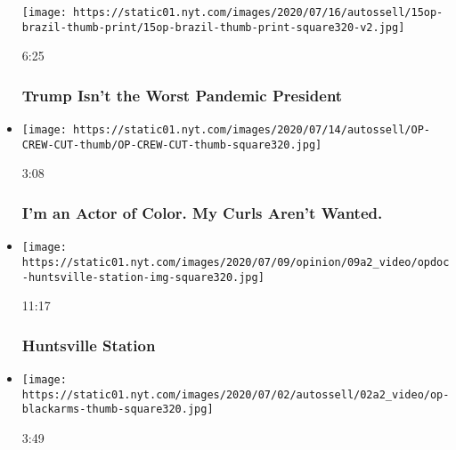 \begin{itemize}
  \texttt{[image: https://static01.nyt.com/images/2020/07/16/autossell/15op-brazil-thumb-print/15op-brazil-thumb-print-square320-v2.jpg]}

  6:25

  \hypertarget{trump-isnt-the-worst-pandemic-president}{%
  \subsubsection{Trump Isn't the Worst Pandemic
  President}\label{trump-isnt-the-worst-pandemic-president}}
\item
  \href{https://www.nytimes.com/video/opinion/100000007227752/hollywood-latinos-diversity.html?action=click\&module=video-series-bar\&region=header\&pgtype=Article\&playlistId=video/opinion}{}

  \texttt{[image: https://static01.nyt.com/images/2020/07/14/autossell/OP-CREW-CUT-thumb/OP-CREW-CUT-thumb-square320.jpg]}

  3:08

  \hypertarget{im-an-actor-of-color-my-curls-arent-wanted}{%
  \subsubsection{I'm an Actor of Color. My Curls Aren't
  Wanted.}\label{im-an-actor-of-color-my-curls-arent-wanted}}
\item
  \href{https://www.nytimes.com/video/opinion/100000007080462/huntsville-station.html?action=click\&module=video-series-bar\&region=header\&pgtype=Article\&playlistId=video/opinion}{}

  \texttt{[image: https://static01.nyt.com/images/2020/07/09/opinion/09a2\_video/opdoc-huntsville-station-img-square320.jpg]}

  11:17

  \hypertarget{huntsville-station}{%
  \subsubsection{Huntsville Station}\label{huntsville-station}}
\item
  \href{https://www.nytimes.com/video/embedded/opinion/100000007209565/black-gun-ownership.html?action=click\&module=video-series-bar\&region=header\&pgtype=Article\&playlistId=video/opinion}{}

  \texttt{[image: https://static01.nyt.com/images/2020/07/02/autossell/02a2\_video/op-blackarms-thumb-square320.jpg]}

  3:49


\end{itemize}
